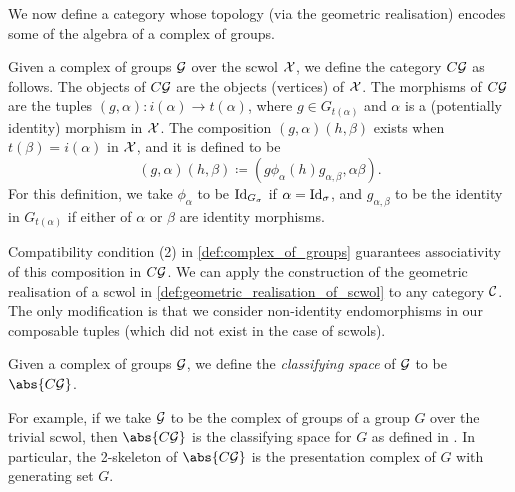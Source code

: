 We now define a category whose topology (via the geometric realisation) encodes some of the algebra of a complex of groups.
\begin{definition}
	Given a complex of groups $\mathcal{G}$ over the scwol  $\mathcal{X}$, we define the category $C\mathcal{G}$ as follows.
	The objects of  $C\mathcal{G}$ are the objects (vertices) of $\mathcal{X}$.
	The morphisms of $C\mathcal{G}$ are the tuples $(g,\alpha) \colon i(\alpha) \to t(\alpha)$, where  $g \in G_{t(\alpha)}$ and  $\alpha$ is a (potentially identity) morphism in $\mathcal{X}$.
	The composition  $(g,\alpha)(h,\beta)$ exists when  $t(\beta) = i(\alpha)$ in  $\mathcal{X}$, and it is defined to be
	\[
		(g,\alpha)(h,\beta) \coloneq (g\phi_\alpha(h)g_{\alpha,\beta}, \alpha\beta)
		.\]
	For this definition, we take $\phi_{\alpha}$ to be $\operatorname{Id}_{G_\sigma}$ if $\alpha = \operatorname{Id}_\sigma$, and $g_{\alpha,\beta}$ to be the identity in $G_{t(\alpha)}$ if either of $\alpha$ or  $\beta$ are identity morphisms.
\end{definition}
Compatibility condition (2) in \cref{def:complex_of_groups} guarantees associativity of this composition in  $C\mathcal{G}$.
We can apply the construction of the geometric realisation of a scwol in \cref{def:geometric_realisation_of_scwol} to any category $\mathcal{C}$.
The only modification is that we consider non-identity endomorphisms in our composable tuples (which did not exist in the case of scwols).

\begin{definition}
	Given a complex of groups $\mathcal{G}$, we define the \emph{classifying space} of  $\mathcal{G}$ to be  $\abs{C\calg}$.
\end{definition}
For example, if we take $\mathcal{G}$ to be the complex of groups of a group  $G$ over the trivial scwol, then $\abs{C\calg}$ is the classifying space for $G$ as defined in \cite[Example 1B.7]{hatcher_algebraic_2001}.
In particular, the 2-skeleton of $\abs{C\calg}$ is the presentation complex of $G$ with generating set $G$.

